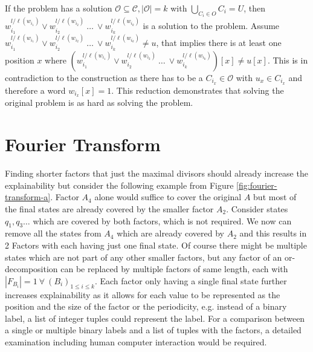 If the {} problem has a solution $\mathcal{O} \subseteq \mathcal{C}, |\mathcal{O}|=k$ with $\bigcup_{C_i \in O} C_i = U$, then $w_{i_1}^{l / \ell(w_{i_1})} \lor w_{i_2}^{l / \ell(w_{i_2})} ~\dots~ \lor w_{i_k}^{l / \ell(w_{i_k})}$ is a solution to the {} problem.
Assume $w_{i_1}^{l / \ell(w_{i_1})} \lor w_{i_2}^{l / \ell(w_{i_2})} ~\dots~ \lor w_{i_k}^{l / \ell(w_{i_k})} \not = u$, that implies there is at least one position $x$ where $(w_{i_1}^{l / \ell(w_{i_1})} \lor w_{i_2}^{l / \ell(w_{i_2})} ~\dots~ \lor w_{i_k}^{l / \ell(w_{i_k})})[x] \not= u[x] $.
This is in contradiction to the construction as there has to be a $C_{i_x} \in \mathcal{O}$ with $u_x \in C_{i_x}$ and therefore a word $w_{i_x}[x]=1$. This reduction demonstrates that solving the original problem is as hard as solving the {} problem.


\section{Fourier Transform}
\label{ch:novel-algos:fourier}
Finding shorter factors that just the maximal divisors should already increase the explainability but consider the following example from Figure \ref{fig:fourier-transform-a}.
Factor $A_4$ alone would suffice to cover the original \DFA $A$ but most of the final states are already covered by the smaller factor $A_2$.
Consider states $q_1, q_3 \dots$ which are covered by both factors, which is not required.
We now can remove all the states from $A_4$ which are already covered by $A_2$ and this results in 2 Factors with each having just one final state.
Of course there might be multiple states which are not part of any other smaller factors, but any factor of an or-decomposition can be replaced by multiple factors of same length, each with $|F_{B_i}| = 1 ~\forall~ (B_i)_{1 \leq i \leq k}$.
Each factor only having a single final state further increases explainability as it allows for each value to be represented as the position and the size of the factor or the periodicity, e.g. instead of a binary label, a list of integer tuples could represent the label.
For a comparison between a single or multiple binary labels and a list of tuples with the factors, a detailed examination including human computer interaction would be required.


